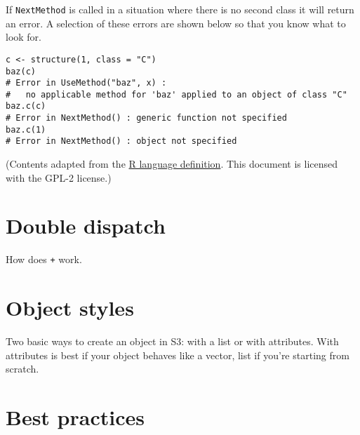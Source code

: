 If \texttt{NextMethod} is called in a situation where there is no second
class it will return an error. A selection of these errors are shown
below so that you know what to look for.

\begin{verbatim}
c <- structure(1, class = "C")
baz(c)
# Error in UseMethod("baz", x) : 
#   no applicable method for 'baz' applied to an object of class "C"
baz.c(c)
# Error in NextMethod() : generic function not specified
baz.c(1)
# Error in NextMethod() : object not specified
\end{verbatim}

(Contents adapted from the
\href{http://cran.r-project.org/doc/manuals/R-lang.html\#Object_002doriented-programming}{R
language definition}. This document is licensed with the GPL-2 license.)

\hypertarget{double-dispatch}{%
\section{Double dispatch}\label{double-dispatch}}

How does \texttt{+} work.

\hypertarget{object-styles}{%
\section{Object styles}\label{object-styles}}

Two basic ways to create an object in S3: with a list or with
attributes. With attributes is best if your object behaves like a
vector, list if you're starting from scratch.

\hypertarget{best-practices}{%
\section{Best practices}\label{best-practices}}


